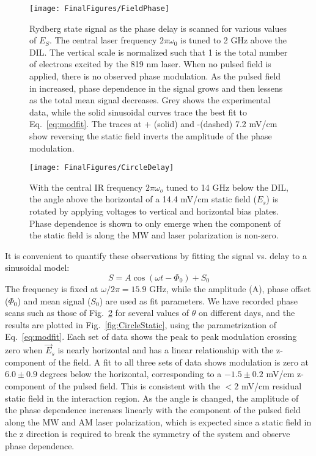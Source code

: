 \documentclass[aps,pra,preprint,groupedaddress]{revtex4-1}
\begin{document}
\begin{figure}
	\texttt{[image: FinalFigures/FieldPhase]}
	\caption{Rydberg state signal as the phase delay is scanned for various values of $E_S$. The central laser frequency $2\pi\omega_0$ is tuned to 2 GHz above the DIL. The vertical scale is normalized such that 1 is the total number of electrons excited by the 819 nm laser. When no pulsed field is applied, there is no observed phase modulation. As the pulsed field in increased,  phase dependence in the signal grows and then lessens as the total mean signal decreases. Grey shows the experimental data, while the solid sinusoidal curves trace the best fit to Eq.~\ref{eq:modfit}. The traces at + (solid) and -(dashed) 7.2 mV/cm show reversing the static field inverts the amplitude of the phase modulation.}
	\label{fig:fph}
\end{figure}

\begin{figure}
	\texttt{[image: FinalFigures/CircleDelay]}
	\caption{With the central IR frequency $2\pi\omega_o$ tuned to 14 GHz below the DIL, the angle above the horizontal of a 14.4 mV/cm static field ($E_s$) is rotated by applying voltages to vertical and horizontal bias plates. Phase dependence is shown to only emerge when the component of the static field is along the MW and laser polarization is non-zero.}
	\label{fig:CircleDelay}
\end{figure}

It is convenient to quantify these observations by fitting the signal vs. delay to a sinusoidal model:
\begin{equation} \label{eq:modfit}
S = A \cos{(\omega t - \Phi_0)} + S_0
\end{equation}
The frequency is fixed at $\omega/2\pi = 15.9$ GHz, while the amplitude (A), phase offset ($\Phi_0$) and mean signal ($S_0$) are used as fit parameters. We have recorded phase scans such as those of Fig.~\ref{fig:CircleDelay} for several values of $\theta$ on different days, and the results are plotted in Fig.~\ref{fig:CircleStatic}, using the parametrization of Eq.~\ref{eq:modfit}. Each set of data shows the peak to peak modulation crossing zero when $\vec{E}_s$ is nearly horizontal and has a linear relationship with the z-component of the field. A fit to all three sets of data shows modulation is zero at $6.0 \pm 0.9$ degrees below the horizontal, corresponding to a $-1.5 \pm 0.2$ mV/cm z-component of the pulsed field. This is consistent with the $<2$ mV/cm residual static field in the interaction region. As the angle is changed, the amplitude of the phase dependence increases linearly with the component of the pulsed field along the MW and AM laser polarization, which is expected since a static field in the z direction is required to break the symmetry of the system and observe phase dependence.
\end{document}
